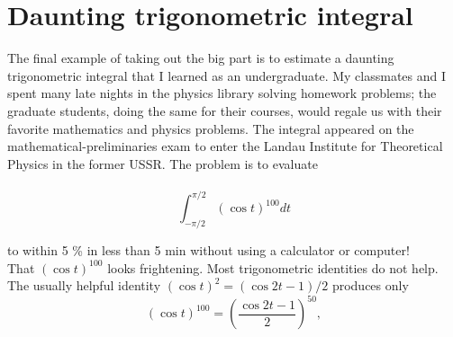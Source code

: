 \documentclass[fleqn]{book}
\newcounter{pro1}
\begin{document}
\section{ \textbf{Daunting trigonometric integral}}
\Large\textrm{ 
The final example of taking out the big part is to estimate a daunting 
trigonometric integral that I learned as an undergraduate. My classmates 
and I spent many late nights in the physics library solving homework 
problems; the graduate students, doing the same for their courses, would 
regale us with their favorite mathematics and physics problems. 
The integral appeared on the mathematical-preliminaries exam to enter 
the Landau Institute for Theoretical Physics in the former USSR. The 
problem is to evaluate}\\ 
\\ \begin{equation}
\int_{-\pi /2}^{\pi /2}(\cos t)^{100}dt
\end{equation} 
\newpage 
\pagestyle{fancy} 
\renewcommand{\headrulewidth}{0pt} 
\fancyhf{} %

\Large\textrm{to within 5 \% in less than 5 min without using a calculator or computer!\\ 
That $(\cos t)^{100}$ looks frightening. Most trigonometric identities do not 
help. The usually helpful identity $(\cos t)^{2}=(\cos 2t -1)/2$ produces only} 
\begin{equation}
(\cos t)^{100}=\left ( \frac{\cos 2t-1}{2} \right )^{50} , 
\end{equation}
\end{document}

